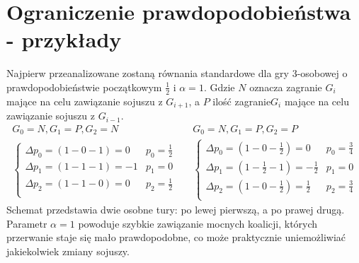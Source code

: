 \section{Ograniczenie prawdopodobieństwa - przykłady}
\label{sec:ograniczenie_przyk}
Najpierw przeanalizowane zostaną równania standardowe dla gry 3-osobowej o prawdopodobieństwie początkowym $\frac{1}{2}$ i $\alpha = 1$. Gdzie $N$ oznacza zagranie $G_i$ mające na celu zawiązanie sojuszu z $G_{i+1}$, a $P$ ilość zagranie$G_i$ mające na celu zawiązanie sojuszu z $G_{i-1}$.
\begin{align*}
G_0 = N, G_1 = P, G_2 = N && G_0 = N, G_1 = P, G_2 = P\\
\left\{
\begin{array}{cc}
\Delta p_0 = (1 - 0 - 1) =  0 & p_0=\frac{1}{2}\\
\Delta p_1 = (1 - 1 - 1) =  -1 & p_1= 0\\
\Delta p_2 = (1 - 1 - 0) =  0 & p_2=\frac{1}{2}\\
\end{array} 
\right. &&
\left\{
\begin{array}{cc}
\Delta p_0 = (1 - 0 - \frac{1}{2}) =  0 & p_0=\frac{3}{4}\\
\Delta p_1 = (1 - \frac{1}{2} - 1) =  -\frac{1}{2} & p_1= 0\\
\Delta p_2 = (1 - 0 - \frac{1}{2}) =  \frac{1}{2} & p_2=\frac{3}{4}\\
\end{array}
\right.
\end{align*}
Schemat przedstawia dwie osobne tury: po lewej pierwszą, a po prawej drugą. Parametr $\alpha=1$ powoduje szybkie zawiązanie mocnych koalicji, których przerwanie staje się mało prawdopodobne, co może praktycznie uniemożliwiać jakiekolwiek zmiany sojuszy.

